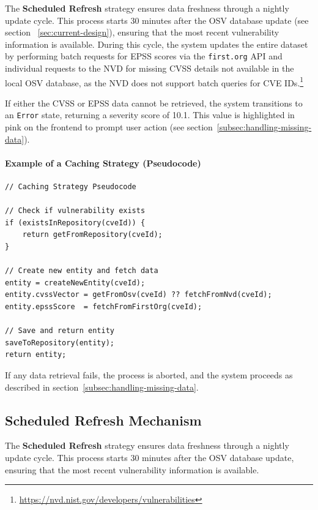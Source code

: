 The \textbf{Scheduled Refresh} strategy ensures data freshness through a nightly update cycle. This process starts 30 minutes after the \ac{OSV} database update (see section ~\ref{sec:current-design}), ensuring that the most recent vulnerability information is available. During this cycle, the system updates the entire dataset by performing batch requests for \ac{EPSS} scores via the \texttt{first.org} \ac{API} and individual requests to the \ac{NVD} for missing \ac{CVSS} details not available in the local \ac{OSV} database, as the \ac{NVD} does not support batch queries for \ac{CVE} IDs.\footnote{\url{https://nvd.nist.gov/developers/vulnerabilities}}

If either the \ac{CVSS} or \ac{EPSS} data cannot be retrieved, the system transitions to an \texttt{Error} state, returning a severity score of 10.1. This value is highlighted in pink on the frontend to prompt user action (see section~\ref{subsec:handling-missing-data}).

\noindent
\paragraph{Example of a Caching Strategy (Pseudocode)}
\label{par:example-caching-strategy}

\begin{verbatim}
// Caching Strategy Pseudocode

// Check if vulnerability exists
if (existsInRepository(cveId)) {
    return getFromRepository(cveId);
}

// Create new entity and fetch data
entity = createNewEntity(cveId);
entity.cvssVector = getFromOsv(cveId) ?? fetchFromNvd(cveId);
entity.epssScore  = fetchFromFirstOrg(cveId);

// Save and return entity
saveToRepository(entity);
return entity;
\end{verbatim}

\noindent
If any data retrieval fails, the process is aborted, and the system proceeds as described in section~\ref{subsec:handling-missing-data}.

\subsection{Scheduled Refresh Mechanism}
\label{subsec:scheduled-refresh}

The \textbf{Scheduled Refresh} strategy ensures data freshness through a nightly update cycle. This process starts 30 minutes after the \ac{OSV} database update, ensuring that the most recent vulnerability information is available.

